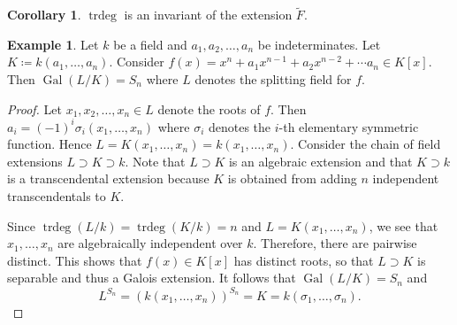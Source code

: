 \documentclass[10pt,letterpaper,cm]{nupset}
\theoremstyle{definition}
\newtheorem{exmp}[definition]{Example}
\theoremstyle{theorem}
\newtheorem{corollary}[definition]{Corollary}
\theoremstyle{remark}
\newcommand{\1}{\mathbf{1}}
\newcommand{\0}{\vec 0}
\DeclareMathOperator{\gal}{Gal}
\DeclareMathOperator{\trdeg}{trdeg}
\begin{document}
\begin{corollary}
$\trdeg$ is an invariant of the extension $\widetilde{F}$.
\end{corollary}

\begin{exmp}
Let $k$ be a field and $a_1, a_2, \ldots, a_n$ be indeterminates.  Let $K\coloneqq  k(a_1, \ldots, a_n)$. Consider $f(x) = x^n + a_1x^{n-1} + a_2x^{n-2} + \cdots a_n \in K[x]$. Then $\gal(L/K) = S_n$ where $L$ denotes the splitting field for $f$.
\end{exmp}
\begin{proof}
Let $x_1, x_2, \ldots, x_n \in L$ denote the roots of $f$. Then $a_i = ({-1})^i\sigma_i(x_1, \ldots, x_n)$ where $\sigma_i$ denotes the $i$-th elementary symmetric function. Hence $L = K(x_1, \ldots, x_n) = k(x_1, \ldots, x_n)$. Consider the chain of field extensions $L \supset K \supset k$. Note that $L \supset K$ is an algebraic extension and that $K \supset k$ is a transcendental extension because $K$ is obtained from adding $n$ independent transcendentals to $K$.

\medskip

 
Since $\trdeg(L/k) = \trdeg(K/k) = n$ and $L = K(x_1, \ldots, x_n)$, we see that $x_1, \ldots, x_n$ are algebraically independent over $k$.  Therefore, there are pairwise distinct. This shows that $f(x) \in K[x]$ has distinct roots, so that $L\supset K$ is separable and thus a Galois extension. It follows that $\gal(L/K) = S_n$ and $$L^{S_n}= \left(k(x_1, \ldots, x_n)\right)^{S_n}= K =k(\sigma_1, \ldots, \sigma_n).$$
\end{proof}
\end{document}
